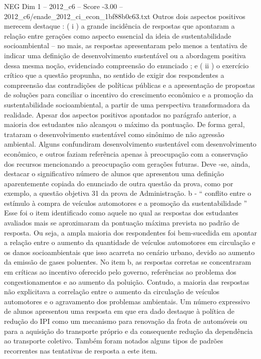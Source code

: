 \begin{textsample}{NEG Dim 1 – 2012\_c6 – Score -3.00 – 2012\_c6/enade\_2012\_ci\_econ\_1bf88b0c63.txt}
Outros dois aspectos positivos merecem destaque : ( i ) a grande incidência de respostas que apontaram a relação entre gerações como aspecto essencial da ideia de sustentabilidade socioambiental – no mais, as respostas apresentaram pelo menos a tentativa de indicar uma definição de desenvolvimento sustentável ou a abordagem positiva dessa mesma noção, evidenciado compreensão do enunciado ; e ( ii ) o exercício crítico que a questão propunha, no sentido de exigir dos respondentes a compreensão das contradições de políticas públicas e a apresentação de propostas de soluções para conciliar o incentivo do crescimento econômico e a promoção da sustentabilidade socioambiental, a partir de uma perspectiva transformadora da realidade.
Apesar dos aspectos positivos apontados no parágrafo anterior, a maioria dos estudantes não alcançou o máximo da pontuação.
De forma geral, trataram o desenvolvimento sustentável como sinônimo de não agressão ambiental.
Alguns confundiram desenvolvimento sustentável com desenvolvimento econômico, e outros faziam referência apenas à preocupação com a conservação dos recursos mencionando a preocupação com gerações futuras.
Deve -se, ainda, destacar o significativo número de alunos que apresentou uma definição aparentemente copiada do enunciado de outra questão da prova, como por exemplo, a questão objetiva 31 da prova de Administração. b - “ conflito entre o estímulo à compra de veículos automotores e a promoção da sustentabilidade ” Esse foi o item identificado como aquele no qual as respostas dos estudantes avaliados mais se aproximaram da pontuação máxima prevista no padrão de resposta.
Ou seja, a ampla maioria dos respondentes foi bem-sucedida em apontar a relação entre o aumento da quantidade de veículos automotores em circulação e os danos socioambientais que isso acarreta no cenário urbano, devido ao aumento da emissão de gases poluentes.
No item b, as respostas corretas se concentraram em críticas ao incentivo oferecido pelo governo, referências ao problema dos congestionamentos e ao aumento da poluição.
Contudo, a maioria das respostas não explicitava a correlação entre o aumento da circulação de veículos automotores e o agravamento dos problemas ambientais.
Um número expressivo de alunos apresentou uma resposta em que era dado destaque à política de redução do IPI como um mecanismo para renovação da frota de automóveis ou para a aquisição do transporte próprio e da consequente redução da dependência ao transporte coletivo.
Também foram notados alguns tipos de padrões recorrentes nas tentativas de resposta a este item.

\end{textsample}
